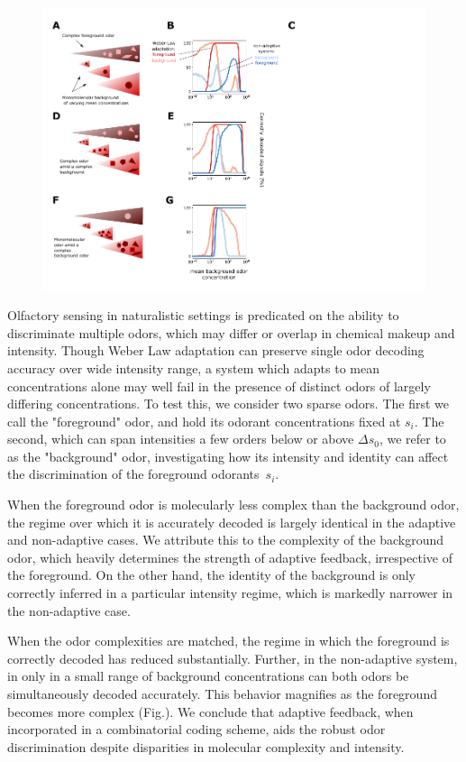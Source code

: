 \begin{figure}
	\includegraphics[width=\textwidth]{figures/Figures_signal_discrimination_weber_law}
\end{figure}

Olfactory sensing in naturalistic settings is predicated on the ability to discriminate multiple odors, which may differ or overlap in chemical makeup and intensity. Though Weber Law adaptation can preserve single odor decoding accuracy over wide intensity range, a system which adapts to mean concentrations alone may well fail in the presence of distinct odors of largely differing concentrations. To test this, we consider two sparse odors. The first we call the "foreground" odor, and hold its odorant concentrations fixed at $s_i$. The second, which can span intensities a few orders below or above $\Delta s_0$, we refer to as the "background" odor, investigating how its intensity and identity can affect the discrimination of the foreground odorants~$s_i$. 

When the foreground odor is molecularly less complex than the background odor, the regime over which it is accurately decoded is largely identical in the adaptive and non-adaptive cases. We attribute this to the complexity of the background odor, which heavily determines the strength of adaptive feedback, irrespective of the foreground. On the other hand, the identity of the background is only correctly inferred in a particular intensity regime, which is markedly narrower in the non-adaptive case.

When the odor complexities are matched, the regime in which the foreground is correctly decoded has reduced substantially. Further, in the non-adaptive system, in only in a small range of background concentrations can both odors be simultaneously decoded accurately. This behavior magnifies as the foreground becomes more complex (Fig.). We conclude that adaptive feedback, when incorporated in a combinatorial coding scheme, aids the robust odor discrimination despite disparities in molecular complexity and intensity. 

